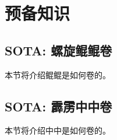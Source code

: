 \section{预备知识}\label{preliminaries}

\subsection{SOTA: 螺旋鲲鲲卷}

本节将介绍鲲鲲\cite{kun}是如何卷的。

\subsection{SOTA: 霹雳中中卷}

本节将介绍中中\cite{zhong}是如何卷的。
